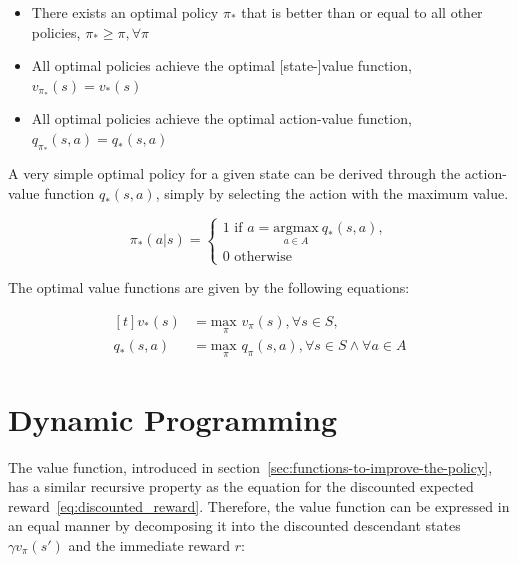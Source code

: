 \documentclass[draft,final]{vutinfth} %
\begin{document}
    \begin{itemize}
        \item There exists an optimal policy $\pi_*$ that is better than or equal to all other policies, $\pi_* \geq \pi, \forall\pi$
        \item All optimal policies achieve the optimal [state-]value function, $v_{\pi_*}(s) = v_*(s)$
        \item All optimal policies achieve the optimal action-value function, $q_{\pi_*}(s,a) = q_*(s,a)$
    \end{itemize}

    A very simple optimal policy for a given state can be derived through the action-value function $q_*(s,a)$, simply by selecting the action with the maximum value.

    \begin{equation}
        \pi_*(a|s) =
        \begin{cases}
            1 \text{ if } a =  \underset{a \in \mathit{A}}{\text{argmax}}\ q_*(s,a),\\
            0 \text{ otherwise }
        \end{cases}
    \end{equation}

    The optimal value functions are given by the following equations:

    \begin{equation}
        \begin{aligned}[t]
            v_*(s) &= \underset{\pi}{\text{max }}v_\pi(s), \forall s \in \mathit{S}, \\
            q_*(s,a) &= \underset{\pi}{\text{max }}q_\pi(s,a), \forall s \in \mathit{S} \land \forall a \in \mathit{A}\label{eq:optimal}
        \end{aligned}
    \end{equation}


    \section{Dynamic Programming}

    The value function, introduced in section~\ref{sec:functions-to-improve-the-policy}, has a similar recursive property as the equation for the discounted expected reward~\eqref{eq:discounted_reward}.
    Therefore, the value function can be expressed in an equal manner by decomposing it into the discounted descendant states $\gamma v_\pi(s')$ and the immediate reward $r$:
\end{document}
